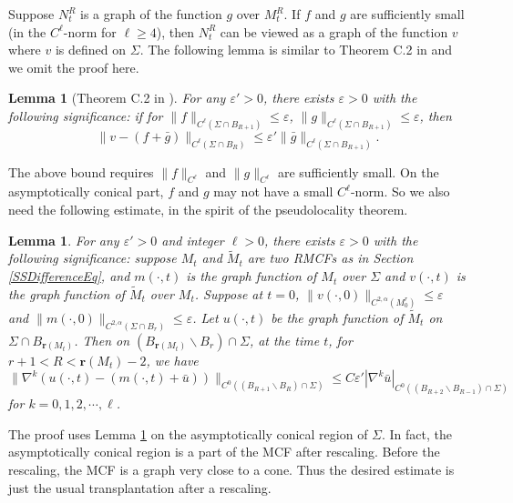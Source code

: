 \documentclass[12pt]{amsart}
\numberwithin{equation}{section}
\newtheorem{lemma}[theorem]{Lemma}
\numberwithin{equation}{section}
\newcommand{\eps}{\varepsilon}
\begin{document}
	Suppose $N_t^R$ is a graph of the function $g$ over $M_t^R$. If $f$ and $g$ are sufficiently small (in the $C^\ell$-norm for $\ell\geq 4$), then $N_t^R$ can be viewed as a graph of the function $v$ where $v$ is defined on $\Sigma$. The following lemma is similar to Theorem C.2 in \cite{SX} and we omit the proof here.
	
	\begin{lemma}[Theorem C.2 in \cite{SX}]\label{Lem;transplantation}
		For any $\eps'>0$, there exists $\eps>0$ with the following significance: if for $\|f\|_{C^{\ell}(\Sigma\cap B_{R+1})}\leq \eps$, $\|g\|_{C^{\ell}(\Sigma\cap B_{R+1})}\leq \eps$, then
		\[\|v-(f+\bar g)\|_{C^{\ell}(\Sigma\cap B_R)}\leq \eps'\|\bar g\|_{C^{\ell}(\Sigma\cap B_{R+1})}.\]
	\end{lemma}
	
	The above bound requires $\|f\|_{C^\ell}$ and $\|g\|_{C^\ell}$ are sufficiently small. On the asymptotically conical part, $f$ and $g$ may not have a small $C^\ell$-norm. So we also need the following estimate, in the spirit of the pseudolocality theorem. 
	
	\begin{lemma}\label{Lem:transplantation-cone}
		For any $\eps'>0$ and integer $\ell>0$, there exists $\eps>0$ with the following significance: suppose $M_t$ and $\widetilde{M}_t$ are two RMCFs as in Section \ref{SSDifferenceEq}, and $m(\cdot,t)$ is the graph function of $M_t$ over $\Sigma$ and $v(\cdot,t)$ is the graph function of $\widetilde{M}_t$ over $M_t$. Suppose at $t=0$, $\|v(\cdot,0)\|_{C^{2,\alpha}(M_0^r)}\leq \eps$ and $\|m(\cdot,0)\|_{C^{2,\alpha}(\Sigma\cap B_r)}\leq \eps$. Let $u(\cdot,t)$ be the graph function of $\widetilde{M}_t$ on $\Sigma\cap B_{\mathbf{r}(M_t)}$. Then on $(B_{\mathbf{r}(M_t)}\backslash B_{r})\cap\Sigma$, at the time $t$, for $r+1<R<\mathbf{r}(M_t)-2$, we have
		\begin{equation*}
			\|\nabla^k(u(\cdot,t)-(m(\cdot,t)+\bar u))\|_{C^0((B_{R+1}\backslash B_{R})\cap\Sigma)}\leq C\eps'|\nabla^k \bar u|_{C^0((B_{R+2}\backslash B_{R-1})\cap\Sigma)}
		\end{equation*}
		for $k=0,1,2,\cdots,\ell$.
	\end{lemma}
	
	The proof uses Lemma \ref{Lem;transplantation} on the asymptotically conical region of $\Sigma$. In fact, the asymptotically conical region is a part of the MCF after rescaling. Before the rescaling, the MCF is a graph very close to a cone. Thus the desired estimate is just the usual transplantation after a rescaling.
	
\end{document}
